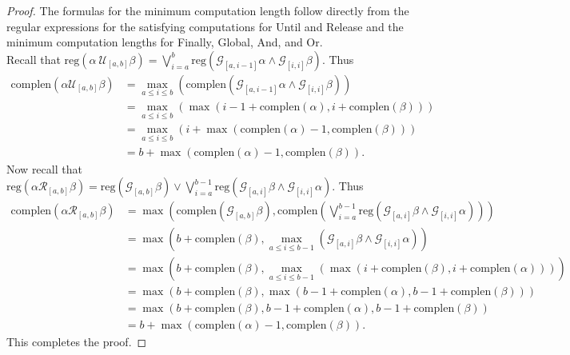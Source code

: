 \documentclass[runningheads]{llncs}
\begin{document}
\begin{proof}
The formulas for the minimum computation length follow directly from the regular expressions for the satisfying computations for Until and Release and the minimum computation lengths for Finally, Global, And, and Or.\\
 Recall that $\text{reg}(\alpha \ \mathcal{U}_{[a,b]} \beta) =  \bigvee_{i=a}^{b} \text{reg}\left(\mathcal{G}_{[a,i-1]}\alpha \land \mathcal{G}_{[i, i]} \beta\right)$. Thus
 \begin{align*}
     \text{complen}(\alpha \mathcal{U}_{[a,b]} \beta) &= \max_{a \leq i \leq b} \left( \text{complen}(\mathcal{G}_{[a, i-1]} \alpha \land \mathcal{G}_{[i,i]} \beta) \right)\\
     &= \max_{a \leq i \leq b} \left( \max(i-1 + \text{complen}(\alpha), i + \text{complen}(\beta))\right)\\
     &= \max_{a \leq i \leq b} \left(i + \max(\text{complen}(\alpha) - 1, \text{complen}(\beta))\right)\\
     &= b + \max(\text{complen}(\alpha) - 1, \text{complen}(\beta)).
 \end{align*}
 Now recall that $\text{reg}(\alpha \mathcal{R}_{[a,b]} \beta) =  \text{reg}\left(\mathcal{G}_{[a,b]}\beta\right) \lor \bigvee_{i=a}^{b-1} \text{reg}\left(\mathcal{G}_{[a,i]}\beta \land \mathcal{G}_{[i, i]} \alpha\right)$. Thus
 \begin{align*}
     \text{complen}(\alpha \mathcal{R}_{[a,b]} \beta) &= \max \left( \text{complen}(\mathcal{G}_{[a,b]} \beta), \text{complen}\left( \bigvee_{i=a}^{b-1} \text{reg}\left(\mathcal{G}_{[a,i]}\beta \land \mathcal{G}_{[i, i]} \alpha\right) \right)  \right)\\
     &= \max\left( b + \text{complen}(\beta), \max_{a \leq i \leq b-1} \left(\mathcal{G}_{[a,i]}\beta \land \mathcal{G}_{[i, i]} \alpha\right) \right)\\
     &= \max \left( b + \text{complen}(\beta), \max_{a \leq i \leq b-1} \left(\max(i + \text{complen}(\beta), i + \text{complen}(\alpha))\right) \right)\\
     &= \max \left( b + \text{complen}(\beta), \max(b-1+\text{complen}(\alpha), b-1+\text{complen}(\beta))\right)\\
     &= \max(b + \text{complen}(\beta), b-1+\text{complen}(\alpha), b-1+\text{complen}(\beta))\\
     &= b + \max(\text{complen}(\alpha)-1, \text{complen}(\beta)).
 \end{align*}
 This completes the proof.
 \end{proof}
 
\end{document}
